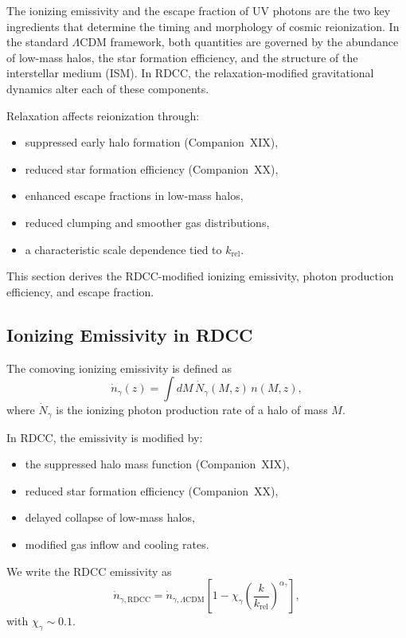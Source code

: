 \documentclass[11pt,a4paper]{article}
\begin{document}
The ionizing emissivity and the escape fraction of UV photons are the two key ingredients
that determine the timing and morphology of cosmic reionization. In the standard
$\Lambda$CDM framework, both quantities are governed by the abundance of low-mass halos,
the star formation efficiency, and the structure of the interstellar medium (ISM). In RDCC,
the relaxation-modified gravitational dynamics alter each of these components.

Relaxation affects reionization through:
\begin{itemize}
\item suppressed early halo formation (Companion~XIX),
\item reduced star formation efficiency (Companion~XX),
\item enhanced escape fractions in low-mass halos,
\item reduced clumping and smoother gas distributions,
\item a characteristic scale dependence tied to $k_{\mathrm{rel}}$.
\end{itemize}

This section derives the RDCC-modified ionizing emissivity, photon production efficiency,
and escape fraction.

\subsection{Ionizing Emissivity in RDCC}

The comoving ionizing emissivity is defined as
\begin{equation}
\dot{n}_{\gamma}(z)
=
\int dM\,
\dot{N}_{\gamma}(M,z)\,
n(M,z),
\end{equation}
where $\dot{N}_{\gamma}$ is the ionizing photon production rate of a halo of mass $M$.

In RDCC, the emissivity is modified by:
\begin{itemize}
\item the suppressed halo mass function (Companion~XIX),
\item reduced star formation efficiency (Companion~XX),
\item delayed collapse of low-mass halos,
\item modified gas inflow and cooling rates.
\end{itemize}

We write the RDCC emissivity as
\begin{equation}
\dot{n}_{\gamma,\mathrm{RDCC}}
=
\dot{n}_{\gamma,\Lambda\mathrm{CDM}}
\left[
1
-
\chi_{\gamma}
\left(
\frac{k}{k_{\mathrm{rel}}}
\right)^{\alpha_{\gamma}}
\right],
\end{equation}
with $\chi_{\gamma} \sim 0.1$.
\end{document}
